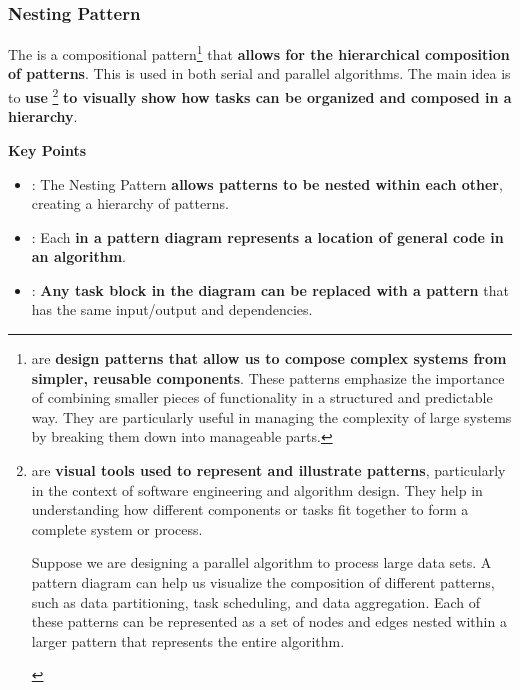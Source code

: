 \subsubsection{Nesting Pattern}

The  is a compositional pattern\footnote{%
     are \textbf{design patterns that allow us to compose complex systems from simpler, reusable components}. These patterns emphasize the importance of combining smaller pieces of functionality in a structured and predictable way. They are particularly useful in managing the complexity of large systems by breaking them down into manageable parts.
} that \textbf{allows for the hierarchical composition of patterns}. This is used in both serial and parallel algorithms. The main idea is to \textbf{use }\footnote{%
     are \textbf{visual tools used to represent and illustrate patterns}, particularly in the context of software engineering and algorithm design. They help in understanding how different components or tasks fit together to form a complete system or process.

    \begin{examplebox}
        Suppose we are designing a parallel algorithm to process large data sets. A pattern diagram can help us visualize the composition of different patterns, such as data partitioning, task scheduling, and data aggregation. Each of these patterns can be represented as a set of nodes and edges nested within a larger pattern that represents the entire algorithm.
    \end{examplebox}
} \textbf{to visually show how tasks can be organized and composed in a hierarchy}.

\highspace
\begin{flushleft}
    \textcolor{Green3}{ \textbf{Key Points}}
\end{flushleft}
\begin{itemize}
    \item {}: The Nesting Pattern \textbf{allows patterns to be nested within each other}, creating a hierarchy of patterns.
    \item {}: Each \textbf{ in a pattern diagram represents a location of general code in an algorithm}.
    \item {}: \textbf{Any task block in the diagram can be replaced with a pattern} that has the same input/output and dependencies.
\end{itemize}

